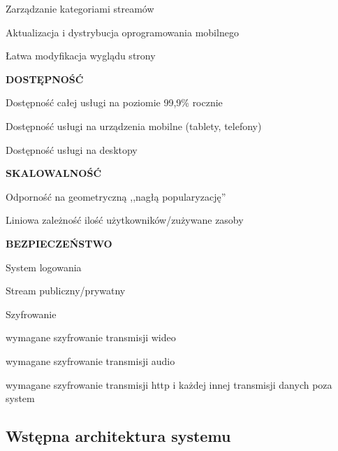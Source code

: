 \begin{packed_item}
{\begin{packed_item}
            \item{Zarządzanie kategoriami streamów}
            \item{Aktualizacja i dystrybucja oprogramowania mobilnego}
            \item{Łatwa modyfikacja wyglądu strony}
        \end{packed_item}
    }
    \item{
        \textbf{DOSTĘPNOŚĆ}
        \begin{packed_item}
            \item{Dostępność całej usługi na poziomie 99,9\% rocznie}
            \item{Dostępność usługi na urządzenia mobilne (tablety, telefony)}
            \item{Dostępność usługi na desktopy}
        \end{packed_item}
    }
    \item{
        \textbf{SKALOWALNOŚĆ}
        \begin{packed_item}
            \item{Odporność na geometryczną ,,nagłą popularyzację''}
            \item{Liniowa zależność ilość użytkowników/zużywane zasoby}
        \end{packed_item}
    }
    \item{
        \textbf{BEZPIECZEŃSTWO}
        \begin{packed_item}
            \item{
                System logowania
            }
            \item{
                Stream publiczny/prywatny
            }
            \item{
                Szyfrowanie
                \begin{packed_item}
                    \item{wymagane szyfrowanie transmisji wideo}
                    \item{wymagane szyfrowanie transmisji audio}
                    \item{wymagane szyfrowanie transmisji http i każdej innej transmisji danych poza system}
                \end{packed_item}
            }
        \end{packed_item}
    }
\end{packed_item}

\subsection{Wstępna architektura systemu}

